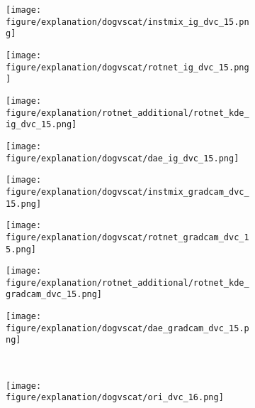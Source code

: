 \documentclass{article} \usepackage{iclr2021_conference,times}
\begin{document}
\begin{figure}[h!]
\begin{subfigure}{.11\textwidth}
\end{subfigure}
\hspace{-2mm}
\begin{subfigure}{.11\textwidth}
  \centering
  \texttt{[image: figure/explanation/dogvscat/instmix\_ig\_dvc\_15.png]}
\end{subfigure}
\hspace{-2mm}
\begin{subfigure}{.11\textwidth}
  \centering
  \texttt{[image: figure/explanation/dogvscat/rotnet\_ig\_dvc\_15.png]}
\end{subfigure}
\hspace{-2mm}
\begin{subfigure}{.11\textwidth}
  \centering
  \texttt{[image: figure/explanation/rotnet\_additional/rotnet\_kde\_ig\_dvc\_15.png]}
\end{subfigure}
\hspace{-2mm}
\begin{subfigure}{.11\textwidth}
  \centering
  \texttt{[image: figure/explanation/dogvscat/dae\_ig\_dvc\_15.png]}
\end{subfigure}
\hspace{-2mm}
\begin{subfigure}{.11\textwidth}
  \centering
  \texttt{[image: figure/explanation/dogvscat/instmix\_gradcam\_dvc\_15.png]}
\end{subfigure}
\hspace{-2mm}
\begin{subfigure}{.11\textwidth}
  \centering
  \texttt{[image: figure/explanation/dogvscat/rotnet\_gradcam\_dvc\_15.png]}
\end{subfigure}
\hspace{-2mm}
\begin{subfigure}{.11\textwidth}
  \centering
  \texttt{[image: figure/explanation/rotnet\_additional/rotnet\_kde\_gradcam\_dvc\_15.png]}
\end{subfigure}
\hspace{-2mm}
\begin{subfigure}{.11\textwidth}
  \centering
  \texttt{[image: figure/explanation/dogvscat/dae\_gradcam\_dvc\_15.png]}
\end{subfigure}\\
\begin{subfigure}{.11\textwidth}
  \centering
  \texttt{[image: figure/explanation/dogvscat/ori\_dvc\_16.png]}
\end{subfigure}

\end{figure}
\end{document}
